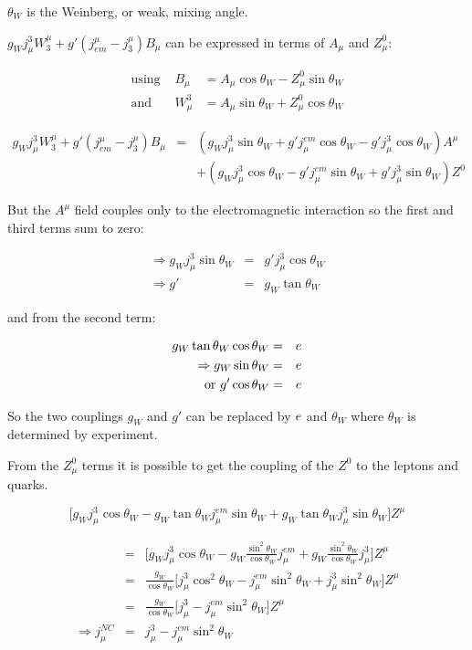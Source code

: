 $\theta_W$ is the Weinberg, or weak, mixing angle.

$g_W j^3_{\mu} W^{\mu}_3 + g'\left(j^{\mu}_{em} - j^{\mu}_3\right)B_{\mu}$ can be expressed in terms of $A_{\mu}$ and $Z^0_{\mu}$:

\begin{eqnarray*}
  \textrm{using } & B_{\mu}   & = A_{\mu}\cos\theta_W - Z^0_{\mu}\sin\theta_W \\
  \textrm{and }   & W^3_{\mu} & = A_{\mu}\sin\theta_W + Z^0_{\mu}\cos\theta_W
\end{eqnarray*}

\begin{eqnarray*}
  g_W j^3_{\mu} W^{\mu}_3 + g'\left(j^{\mu}_{em} - j^{\mu}_3\right)B_{\mu} & = & \left(g_W j^3_{\mu} \sin\theta_W + g'j^{em}_{\mu}\cos\theta_W - g'j^3_{\mu}\cos\theta_W\right)A^{\mu} \\
  & & + \left(g_W j^3_{\mu} \cos\theta_W - g'j^{em}_{\mu}\sin\theta_W + g'j^3_{\mu}\sin\theta_W\right)Z^0
\end{eqnarray*}

But the $A^{\mu}$ field couples only to the electromagnetic interaction so the first and third terms sum to zero:

\begin{eqnarray*}
  \Rightarrow g_W j^3_{\mu}\sin\theta_W & = & g' j^3_{\mu}\cos\theta_W \\
  \Rightarrow g' & = & g_W \tan\theta_W
\end{eqnarray*}

and from the second term:

\begin{eqnarray*}
  g_W\tan\theta_W\cos\theta_W & = & e \\
  \Rightarrow g_W\sin\theta_W & = & e \\
  \textrm{or } g'\cos\theta_W & = & e
\end{eqnarray*}

So the two couplings $g_W$ and $g'$ can be replaced by $e$ and $\theta_W$ where $\theta_W$ is determined by experiment.

From the $Z^0_{\mu}$ terms it is possible to get the coupling of the $Z^0$ to the leptons and quarks.

\[
  \Big[g_Wj^3_{\mu}\cos\theta_W - g_W\tan\theta_Wj^{em}_{\mu}\sin\theta_W + g_W\tan\theta_W j^3_{\mu}\sin\theta_W\Big] Z^{\mu}
\]

\begin{eqnarray*}
  & = & \Bigg[ g_Wj^3_{\mu}\cos\theta_W - g_W\frac{\sin^2\theta_W}{\cos\theta_W}j^{em}_{\mu} + g_W\frac{\sin^2\theta_W}{\cos\theta_W}j^3_{\mu}\Bigg]Z^{\mu} \\
  & = & \frac{g_W}{\cos\theta_W}\Big[j^3_{\mu}\cos^2\theta_W - j^{em}_{\mu}\sin^2\theta_W + j^3_{\mu}\sin^2\theta_W\Big]Z^{\mu} \\
  & = & \frac{g_W}{\cos\theta_W}\Big[j^3_{\mu} - j^{em}_{\mu}\sin^2\theta_W\Big]Z^{\mu} \\
  \Rightarrow j^{NC}_{\mu} & = & j^3_{\mu} - j^{em}_{\mu}\sin^2\theta_W
\end{eqnarray*}


